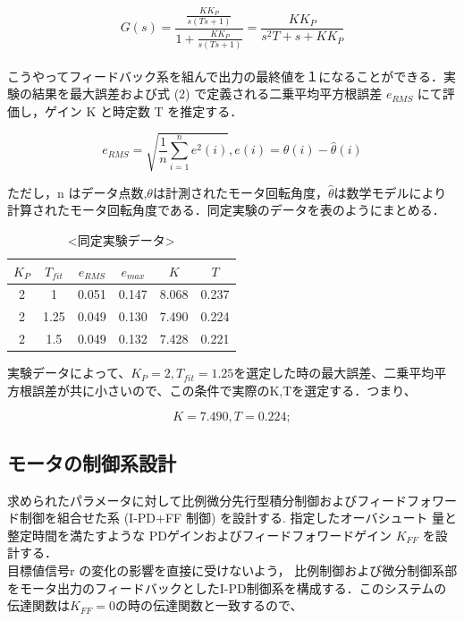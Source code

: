 \documentclass[xelatex,ja=standard,jafont=noto]{bxjsarticle}
\numberwithin{figure}{section}
\begin{document}
\begin{equation}
    G(s)=\frac{\frac{KK_{P}}{s(Ts+1)}}{1+\frac{KK_{P}}{s(Ts+1)}}=\frac{KK_{P}}{s^{2}T+s+KK_{P}}
\end{equation}\\

こうやってフィードバック系を組んで出力の最終値を１になることができる．実験の結果を最大誤差および式 (2) で定義される二乗平均平方根誤差 $e_{RMS}$ にて評価し，ゲイン K と時定数 T を推定する．

\begin{equation}
    e_{RMS}=\sqrt{\frac{1}{n}\sum_{i=1}^{n}e^{2}(i)},e(i)=\theta(i)-\hat{\theta}(i)
\end{equation}

ただし，n はデータ点数,$θ$は計測されたモータ回転角度，$\hat{\theta}$は数学モデルにより計算されたモータ回転角度である．同定実験のデータを表のようにまとめる．

\begin{table}[!htbp]
\centering
\caption{<同定実験データ>}
\begin{tabular}{cccccc}
\hline
 $ K_{P}$ & $T_{fit}$ & $e_{RMS}$ & $e_{max}$& $K$ & $T$\\
\hline
2& 1& 0.051& 0.147&8.068& 0.237\\
 2& 1.25& 0.049&0.130&7.490&0.224\\
2 & 1.5&0.049 &0.132&7.428&0.221\\
\hline
\end{tabular}
\end{table}

実験データによって、$K_{P}=2,T_{fit}=1.25$を選定した時の最大誤差、二乗平均平方根誤差が共に小さいので、この条件で実際のK,Tを選定する．つまり、




\begin{equation}
    K=7.490,T=0.224;
\end{equation}

\subsection{モータの制御系設計}


求められたパラメータに対して比例微分先行型積分制御およびフィードフォワード制御を組合せた系
(I-PD+FF 制御) を設計する. 指定したオーバシュート
量と整定時間を満たすような PDゲインおよびフィードフォワードゲイン $K_{FF}$ を設計する．\\

目標値信号r の変化の影響を直接に受けないよう，
比例制御および微分制御系部をモータ出力のフィードバックとしたI-PD制御系を構成する．このシステムの伝達関数は$K_{FF}=0$の時の伝達関数と一致するので、
\end{document}
